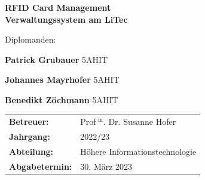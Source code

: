\begin{titlepage}


\vspace*{5cm}

{
\color{litec-blue}
\noindent
\Huge\textbf{RFID Card Management}\\

\vspace{0.2cm}
\noindent
\huge\textbf{Verwaltungssystem am LiTec}
}

\vspace*{4cm}
\begin{spacing}{1.5}
\Large
\hfill Diplomanden:\\\par
\hfill\textbf{Patrick Grubauer}   \hspace{1cm}5AHIT\par
\hfill\textbf{Johannes Mayrhofer} \hspace{1cm}5AHIT\par
\hfill\textbf{Benedikt Zöchmann}  \hspace{1cm}5AHIT
\end{spacing}

\vfill

{
\hspace{-1cm}
\renewcommand{\arraystretch}{1.5}
\Large
\begin{tabular}{ll}
     \textbf{Betreuer:} & Prof$^\text{ in}$. Dr. Susanne Hofer\\
     \textbf{Jahrgang:} & 2022/23\\
     \textbf{Abteilung:} & Höhere Informationstechnologie\\
     \textbf{Abgabetermin:} & 30. März 2023
\end{tabular}
}

\end{titlepage}

